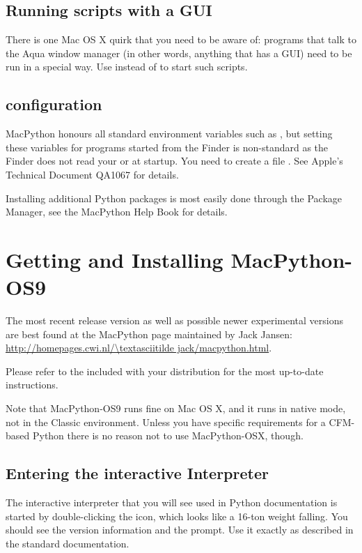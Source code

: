 \subsection{Running scripts with a GUI \label{osx-gui-scripts}}

There is one Mac OS X quirk that you need to be aware of: programs
that talk to the Aqua window manager (in other words, anything that
has a GUI) need to be run in a special way. Use 
instead of  to start such scripts.

\subsection{configuration}

MacPython honours all standard \UNIX{} environment variables such as
, but setting these variables for programs started
from the Finder is non-standard
as the Finder does not read your  or  at startup.
You need to create a file .
See Apple's Technical Document QA1067 for details.

Installing additional Python packages is most easily done through the
Package Manager, see the MacPython Help Book for details.

\section{Getting and Installing MacPython-OS9 \label{getting}}

The most recent release version as well as possible newer experimental
versions are best found at the MacPython page maintained by Jack
Jansen: \url{http://homepages.cwi.nl/\textasciitilde jack/macpython.html}.

Please refer to the  included with your distribution for
the most up-to-date instructions.

Note that MacPython-OS9 runs fine on Mac OS X, and it runs in native
mode, not in the Classic environment. Unless you have specific
requirements for a CFM-based Python there is no reason not to
use MacPython-OSX, though.


\subsection{Entering the interactive Interpreter
         \label{interpreter}}

The interactive interpreter that you will see used in Python
documentation is started by double-clicking the
 icon, which looks like a 16-ton weight
falling. You should see the version information and the
\samp{>\code{>}>~} prompt.  Use it exactly as described in the
standard documentation.


